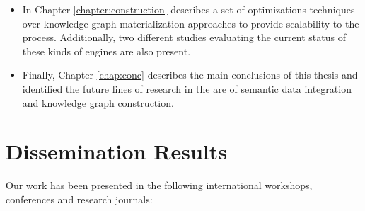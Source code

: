 \begin{itemize}
    \item In Chapter \ref{chapter:construction} describes a set of optimizations techniques over knowledge graph materialization approaches to provide scalability to the process. Additionally, two different studies evaluating the current status of these kinds of engines are also present.
    \item Finally, Chapter \ref{chap:conc} describes the main conclusions of this thesis and identified the future lines of research in the are of semantic data integration and knowledge graph construction.
\end{itemize}


\section{Dissemination Results}
\label{sec:disresults}

Our work has been presented in the following international workshops, conferences and research journals:


